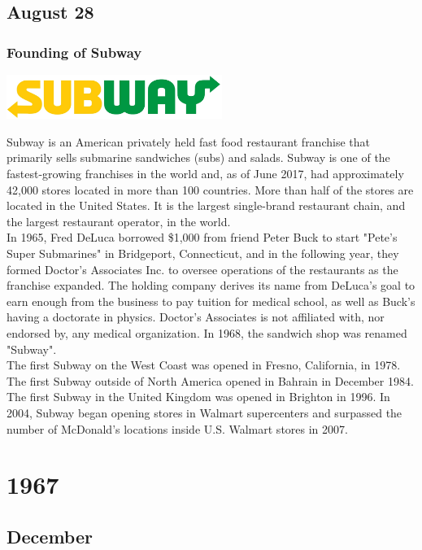 \documentclass[11pt]{report}
\begin{document}
\section{August 28}
\subsection{Founding of Subway}
\vspace{2mm}\begin{center}\includegraphics[width=7cm]{./img/subwayLogo.jpg}\end{center}
Subway is an American privately held fast food restaurant franchise that primarily sells submarine sandwiches (subs) and salads. Subway is one of the fastest-growing franchises in the world and, as of June 2017, had approximately 42,000 stores located in more than 100 countries. More than half of the stores are located in the United States. It is the largest single-brand restaurant chain, and the largest restaurant operator, in the world.\\
\indent In 1965, Fred DeLuca borrowed \$1,000 from friend Peter Buck to start "Pete's Super Submarines" in Bridgeport, Connecticut, and in the following year, they formed Doctor's Associates Inc. to oversee operations of the restaurants as the franchise expanded. The holding company derives its name from DeLuca's goal to earn enough from the business to pay tuition for medical school, as well as Buck's having a doctorate in physics. Doctor's Associates is not affiliated with, nor endorsed by, any medical organization. In 1968, the sandwich shop was renamed "Subway".\\
\indent The first Subway on the West Coast was opened in Fresno, California, in 1978. The first Subway outside of North America opened in Bahrain in December 1984. The first Subway in the United Kingdom was opened in Brighton in 1996. In 2004, Subway began opening stores in Walmart supercenters and surpassed the number of McDonald's locations inside U.S. Walmart stores in 2007.

\chapter{1967}
\section{December}
\end{document}
